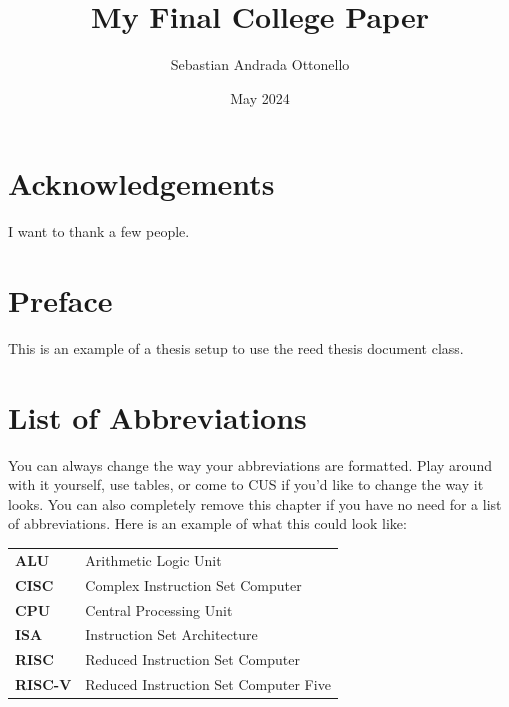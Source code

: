 \documentclass[12pt,twoside]{reedthesis}
\title{My Final College Paper}
\author{Sebastian Andrada Ottonello}
\date{May 2024}
\begin{document}
\maketitle
\frontmatter %
\pagestyle{empty} %

\chapter*{Acknowledgements}
I want to thank a few people.

\chapter*{Preface}
This is an example of a thesis setup to use the reed thesis document class.



\chapter*{List of Abbreviations}
You can always change the way your abbreviations are formatted. Play around with it yourself, use tables, or come to CUS if you'd like to change the way it looks. You can also completely remove this chapter if you have no need for a list of abbreviations. Here is an example of what this could look like:

\begin{table}[h]
	\centering %
	\begin{tabular}{ll}
		\textbf{ALU}    & Arithmetic Logic Unit                 \\
		\textbf{CISC}   & Complex Instruction Set Computer      \\
		\textbf{CPU}    & Central Processing Unit               \\
		\textbf{ISA}    & Instruction Set Architecture          \\
		\textbf{RISC}   & Reduced Instruction Set Computer      \\
		\textbf{RISC-V} & Reduced Instruction Set Computer Five \\
	\end{tabular}
\end{table}


\tableofcontents
\listoftables
\listoffigures
\end{document}
